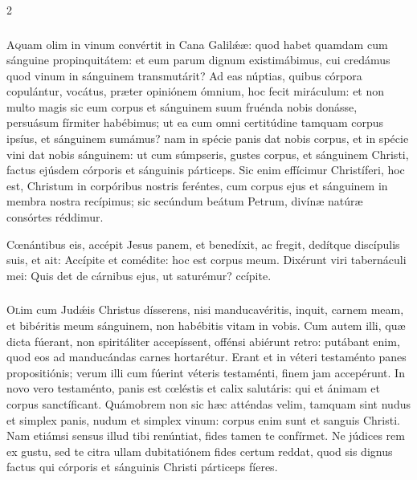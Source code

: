 \documentclass[9pt,twoside]{extarticle}
\begin{document}
\begin{multicols}{2}
\subsubsection*{\center {}}
\lettrine{A}quam olim in vinum convértit in Cana Galilǽæ: quod habet quamdam cum sánguine propinquitátem: et eum parum dignum existimábimus, cui credámus quod vinum in sánguinem transmutárit? Ad eas núptias, quibus córpora copulántur, vocátus, præter opiniónem ómnium, hoc fecit miráculum: et non multo magis sic eum corpus et sánguinem suum fruénda nobis donásse, persuásum fírmiter habébimus; ut ea cum omni certitúdine tamquam corpus ipsíus, et sánguinem sumámus? nam in spécie panis dat nobis corpus, et in spécie vini dat nobis sánguinem: ut cum súmpseris, gustes corpus, et sánguinem Christi, factus ejúsdem córporis et sánguinis párticeps. Sic enim effícimur Christíferi, hoc est, Christum in corpóribus nostris feréntes, cum corpus ejus et sánguinem in membra nostra recípimus; sic secúndum beátum Petrum, divínæ natúræ consórtes réddimur. 

\begin{tightlist}{}
\item {} Cœnántibus eis, accépit Jesus panem, et benedíxit, ac fregit, dedítque discípulis suis, et ait: \textred{*} Accípite et comédite: hoc est corpus meum.  Dixérunt viri tabernáculi mei: Quis det de cárnibus ejus, ut saturémur? ccípite.
\end{tightlist}

\subsubsection*{\center {}}
\lettrine{O}lim cum Judǽis Christus dísserens, nisi manducavéritis, inquit, carnem meam, et bibéritis meum sánguinem, non habébitis vitam in vobis. Cum autem illi, quæ dicta fúerant, non spiritáliter accepíssent, offénsi abiérunt retro: putábant enim, quod eos ad manducándas carnes hortarétur. Erant et in véteri testaménto panes propositiónis; verum illi cum fúerint véteris testaménti, finem jam accepérunt. In novo vero testaménto, panis est cœléstis et calix salutáris: qui et ánimam et corpus sanctíficant. Quámobrem non sic hæc atténdas velim, tamquam sint nudus et simplex panis, nudum et simplex vinum: corpus enim sunt et sanguis Christi. Nam etiámsi sensus illud tibi renúntiat, fides tamen te confírmet. Ne júdices rem ex gustu, sed te citra ullam dubitatiónem fides certum reddat, quod sis dignus factus qui córporis et sánguinis Christi párticeps fíeres.


\end{multicols}
\end{document}
